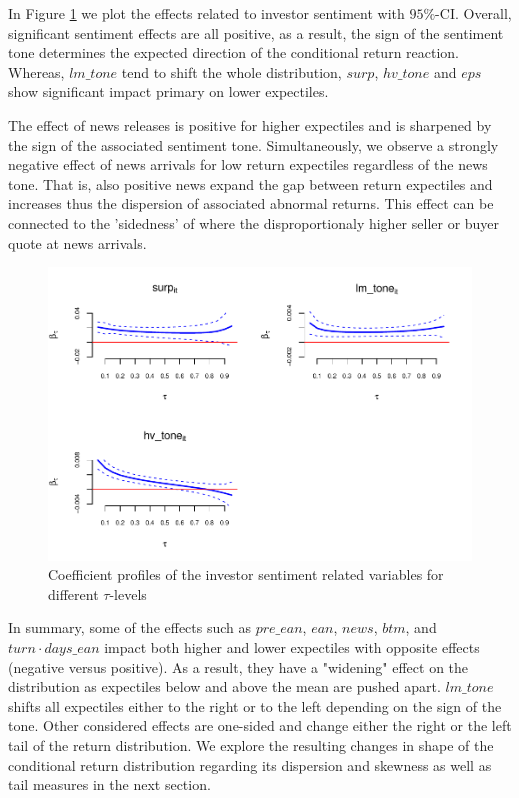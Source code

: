 \documentclass[]{article}
\begin{document}
In Figure \ref{fig:figure3} we plot the effects related to investor sentiment with $95\%$-CI.
Overall, significant sentiment effects are all positive, as a result, the sign of the sentiment tone determines the expected direction of the conditional return reaction. Whereas, $lm\_tone$ tend to shift the whole distribution, $surp$, $hv\_tone$ and $eps$ show significant impact primary on lower expectiles.

The effect of news releases is positive for higher expectiles and is sharpened by the sign of the associated sentiment tone. Simultaneously, we observe a strongly negative effect of news arrivals for low return expectiles regardless of the news tone. That is, also positive news expand the gap between return expectiles and increases thus the dispersion of  associated abnormal returns. This effect can be connected to the 'sidedness' of \cite{SARKAR2009} where the disproportionaly higher seller or buyer quote at news arrivals.

\begin{figure}[h!]
\centering
\includegraphics{sentiment_analysis_files/figure-latex/figure3-1.pdf}
\caption{\label{fig:figure3}Coefficient profiles of the investor sentiment related variables for different \(\tau\)-levels}
\end{figure}

In summary, some of the effects such as $pre\_ean$, $ean$, $news$, $btm$, and $turn\cdot days\_ean$ impact both higher and lower expectiles with opposite effects (negative versus positive). As a result, they have a "widening" effect on the distribution as expectiles below and above the mean are pushed apart. $lm\_tone$ shifts all expectiles either to the right or to the left depending on the sign of the tone. Other considered effects are one-sided and change either the right or the left tail of the return distribution. We explore the resulting changes in shape of the conditional return distribution regarding its dispersion and skewness as well as tail measures in the next section.
\end{document}
